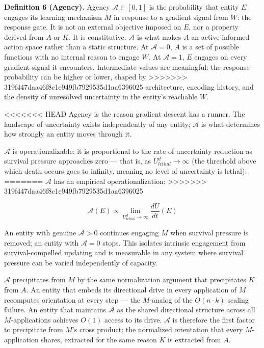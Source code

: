 \documentclass[
]{article}
\begin{document}
\textbf{Definition 6 (Agency).} Agency \(\mathcal{A} \in [0, 1]\) is the
probability that entity \(E\) engages its learning mechanism \(M\) in
response to a gradient signal from \(W\): the response gate. It is not
an external objective imposed on \(E\), nor a property derived from
\(A\) or \(K\). It is constitutive: \(\mathcal{A}\) is what makes \(A\)
an active informed action space rather than a static structure. At
\(\mathcal{A} = 0\), \(A\) is a set of possible functions with no
internal reason to engage \(W\). At \(\mathcal{A} = 1\), \(E\) engages
on every gradient signal it encounters. Intermediate values are
meaningful: the response probability can be higher or lower, shaped by
>>>>>>> 319f447daa46f8c1e949fb7929535d1aa6396025
architecture, encoding history, and the density of unresolved
uncertainty in the entity's reachable \(W\).

<<<<<<< HEAD
Agency is the reason gradient descent has a runner. The landscape of
uncertainty exists independently of any entity; \(\mathcal{A}\) is what
determines how strongly an entity moves through it.

\(\mathcal{A}\) is operationalizable: it is proportional to the rate of
uncertainty reduction as survival pressure approaches zero --- that is,
as \(U_{lethal}^d \to \infty\) (the threshold above which death occurs
goes to infinity, meaning no level of uncertainty is lethal):
=======
\(\mathcal{A}\) has an empirical operationalization:
>>>>>>> 319f447daa46f8c1e949fb7929535d1aa6396025

\[\mathcal{A}(E) \propto \lim_{U_{lethal}^d \to \infty} \frac{dU}{dt}(E)\]

An entity with genuine \(\mathcal{A} > 0\) continues engaging \(M\)
when survival pressure is removed; an entity with \(\mathcal{A} = 0\)
stops. This isolates intrinsic engagement from survival-compelled
updating and is measurable in any system where survival pressure can be
varied independently of capacity.

\(\mathcal{A}\) precipitates from \(M\) by the same normalization
argument that precipitates \(K\) from \(A\). An entity that embeds its
directional drive in every application of \(M\) recomputes orientation
at every step --- the \(M\)-analog of the \(O(n \cdot k)\) scaling
failure. An entity that maintains \(\mathcal{A}\) as the shared
directional structure across all \(M\)-applications achieves \(O(1)\)
access to its drive. \(\mathcal{A}\) is therefore the first factor to
precipitate from \(M\)'s cross product: the normalized orientation that
every \(M\)-application shares, extracted for the same reason \(K\) is
extracted from \(A\).
\end{document}

